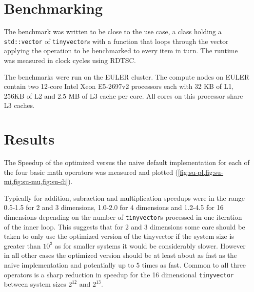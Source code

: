 \documentclass[a4paper]{scrartcl}
\begin{document}
%
%
%

\section*{Benchmarking}
The benchmark was written to be close to the use case, a class holding a \texttt{std::vector} of \texttt{tinyvector}s 
with a function that loops through the vector applying the operation to be benchmarked to every item in turn.
The runtime was measured in clock cycles using RDTSC.

The benchmarks were run on the EULER cluster. The compute nodes on EULER contain two 12-core Intel Xeon E5-2697v2 processors each with 32 KB of L1, 256KB of L2 and 2.5 MB of L3 cache per core.
All cores on this processor share L3 caches.

\section*{Results}
The Speedup of the optimized versus the naive default implementation for each of the four basic math operators was measured and plotted (\cref{fig:su-pl,fig:su-mi,fig:su-mu,fig:su-di}).

Typically for addition, subraction and multiplication speedups were in the range 0.5-1.5 for 2 and 3 dimensions, 1.0-2.0 for 4 dimensions and 1.2-4.5 for 16 dimensions depending on the number of \texttt{tinyvector}s processed in one iteration of the inner loop.
This suggests that for 2 and 3 dimensions some care should be taken to only use the optimized version of the tinyvector if the system size is greater than $10^3$ as for smaller systems it would be considerably slower. However in all other cases the optimized version should be at least about as fast as the naive implementation and potentially up to 5 times as fast.
Common to all three operators is a sharp reduction in speedup for the 16 dimensional \texttt{tinyvector} between system sizes $2^12$ and $2^13$.
\end{document}
